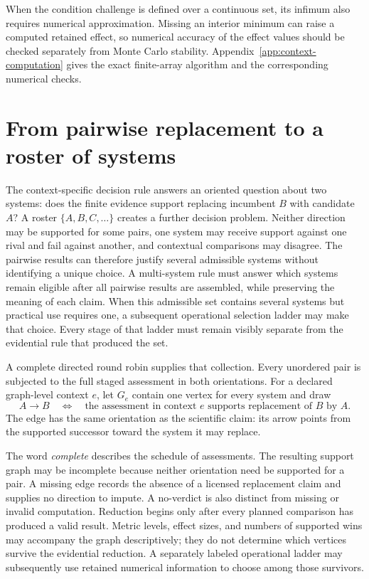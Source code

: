\documentclass[11pt]{article}
\theoremstyle{remark}
\begin{document}
When the condition challenge is defined over a continuous set, its infimum
also requires numerical approximation. Missing an interior minimum can raise a
computed retained effect, so numerical accuracy of the effect values should be
checked separately from Monte Carlo stability. Appendix~\ref{app:context-computation}
gives the exact finite-array algorithm and the corresponding numerical checks.

\section{From pairwise replacement to a roster of systems}
\label{sec:roster}

The context-specific decision rule answers an oriented question
about two systems: does the finite evidence support replacing incumbent $B$
with candidate $A$? A roster $\{A,B,C,\ldots\}$ creates a further decision
problem. Neither direction may be supported for some pairs, one system may
receive support against one rival and fail against another, and contextual comparisons may disagree. The pairwise results can therefore justify
several admissible systems without identifying a unique choice. A
multi-system rule must answer which systems remain eligible after all pairwise
results are assembled, while preserving the meaning of each claim.
When this admissible set contains several systems but practical use requires
one, a subsequent operational selection ladder may make that choice. Every
stage of that ladder must remain visibly separate from the evidential rule
that produced the set.

A complete directed round robin supplies that collection. Every unordered
pair is subjected to the full staged assessment in both orientations. For a
declared graph-level context $e$, let $G_e$ contain one vertex for every system
and draw
\[
A\longrightarrow B
\quad\Longleftrightarrow\quad
\text{the assessment in context $e$ supports replacement of $B$ by $A$}.
\]
The edge has the same orientation as the scientific claim: its arrow points
from the supported successor toward the system it may replace.

The word \emph{complete} describes the schedule of assessments. The resulting
support graph may be incomplete because neither orientation need be supported
for a pair. A missing edge records the absence of a licensed replacement
claim and supplies no direction to impute. A no-verdict is also distinct from
missing or invalid computation. Reduction begins only after every planned
comparison has produced a valid result. Metric levels, effect sizes, and
numbers of supported wins may accompany the graph descriptively; they do not
determine which vertices survive the evidential reduction. A separately
labeled operational ladder may subsequently use retained numerical information
to choose among those survivors.
\end{document}
